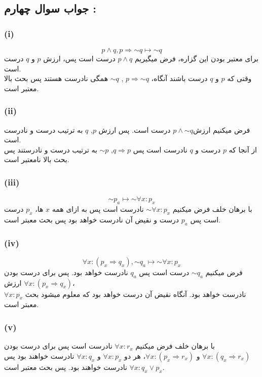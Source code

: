 \documentclass{article}
\newcommand{\tildevar}{\mathord{\sim}}
\begin{document}
		\subsection*{جواب سوال چهارم :}
			\subsubsection*{(i)}
				\[
				p \land q, p \Rightarrow \tildevar q \mapsto \tildevar q
				\]
				برای معتبر بودن این گزاره، فرض میگیریم $p \land q$ درست است پس، ارزش $p$ و $q$ درست است.\\
				وقتی که $p$ و $q$ درست باشند آنگاه، $p \Rightarrow \tildevar q$ , $\tildevar q$ همگی نادرست هستند پس بحث بالا معتبر است.
			
			\subsubsection*{(ii)}
				فرض میکنیم ارزش$p \land \tildevar q$ درست است. پس ارزش $p$, $q$ به ترتیب درست و نادرست است.\\
				از آنجا که $p$ درست و $q$ نادرست است پس $q \Rightarrow p$, $\tildevar p$ به ترتیب درست و نادرستند پس بحث بالا نامعتبر است.

			\subsubsection*{(iii)}
				\[
				\tildevar p_a \mapsto \tildevar \forall x:  p_x
				\]
				با برهان خلف فرض میکنیم $\tildevar \forall x:  p_x$ نادرست است پس به ازای همه $x$ ها، $p_x$ درست است پس $p_a$ درست و نقیض آن نادرست خواهد بود پس بحث معبتر است.
			
			\subsubsection*{(iv)}
				\[
				\forall x: (p_x \Rightarrow q_x), \tildevar q_a \mapsto \tildevar \forall x: p_x
				\]
				فرض میکنیم $\tildevar q_a$ درست است پس $q_a$ نادرست خواهد بود. پس برای درست بودن ارزش $\forall x: (p_x \Rightarrow q_x)$،\\
				$\forall x : p_x$ نادرست خواهد بود. آنگاه نقیض آن درست خواهد بود که معلوم میشود بحث معبتر است.

			\subsubsection*{(v)}
				با برهان خلف فرض میکنیم $\forall x: r_x$ نادرست است پس برای درست بودن $\forall x: (q_x \Rightarrow r_x)$ و $\forall x: (p_x \Rightarrow r_x)$،
				هر دو $\forall x: p_x$ و $\forall x: q_x$ نادرست خواهند بود پس $\forall x: q_x \lor p_x$ نادرست خواهند بود. پس بحث معتبر است.
		
\end{document}
